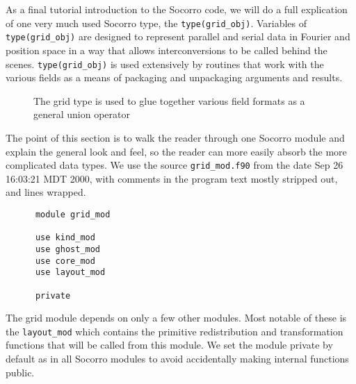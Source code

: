 As a final tutorial introduction to the Socorro code, we will
do a full explication of one very much used Socorro type, the
\verb+type(grid_obj)+.  Variables of \verb+type(grid_obj)+ are
designed to represent parallel and serial data in Fourier
and position space in a way that allows interconversions to be
called behind the scenes.  \verb+type(grid_obj)+ is used extensively
by routines that work with the various fields as a means of packaging
and unpackaging arguments and results.


\begin{figure}
\begin{center}
\caption{The grid type is used to glue together various field formats
as a general union operator}
\label{gridfig}
\end{center}
\end{figure}

The point of this section is to walk the reader through one Socorro
module and explain the general look and feel, so the reader can more
easily absorb the more complicated data types.  We use the source
\verb+grid_mod.f90+ from the date {Sep 26 16:03:21 MDT 2000},
with comments in the program text mostly stripped out, and lines
wrapped.

\begin{verbatim}
      module grid_mod

      use kind_mod
      use ghost_mod
      use core_mod
      use layout_mod

      private
\end{verbatim}
The grid module depends on only a few other modules.  Most notable of
these is the \verb+layout_mod+ which contains the primitive redistribution
and transformation functions that will be called from this module.  We
set the module private by default as in all Socorro modules to avoid
accidentally making internal functions public.

